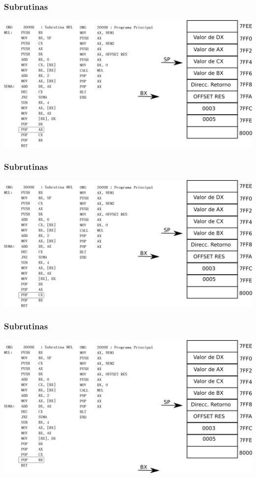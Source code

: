 \documentclass{beamer}
\begin{document}
\begin{frame}
\frametitle{Subrutinas}
\includegraphics[scale=0.70]{imgs/imagen_015.png}
\end{frame}

\begin{frame}
\frametitle{Subrutinas}
\includegraphics[scale=0.70]{imgs/imagen_016.png}
\end{frame}

\begin{frame}
\frametitle{Subrutinas}
\includegraphics[scale=0.70]{imgs/imagen_017.png}
\end{frame}
\end{document}

